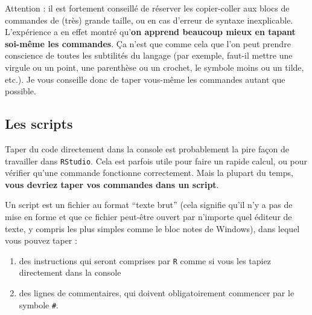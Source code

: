\documentclass[
  a4paper,
  DIV=11,
  numbers=noendperiod,
  oneside]{scrreprt}
\providecommand{\tightlist}{%
  \setlength{\itemsep}{0pt}\setlength{\parskip}{0pt}}\usepackage{longtable,booktabs,array}
\begin{document}
\begin{tcolorbox}[enhanced jigsaw, colbacktitle=quarto-callout-warning-color!10!white, left=2mm, leftrule=.75mm, titlerule=0mm, bottomtitle=1mm, colback=white, breakable, arc=.35mm, bottomrule=.15mm, toprule=.15mm, toptitle=1mm, opacitybacktitle=0.6, title=\textcolor{quarto-callout-warning-color}{\faExclamationTriangle}\hspace{0.5em}{Les risques du ``copier-coller'' {\faIcon{clipboard}}}, coltitle=black, rightrule=.15mm, opacityback=0, colframe=quarto-callout-warning-color-frame]

Attention : il est fortement conseillé de réserver les copier-coller aux
blocs de commandes de (très) grande taille, ou en cas d'erreur de
syntaxe inexplicable. L'expérience a en effet montré qu'\textbf{on
apprend beaucoup mieux {en tapant soi-même les commandes}}. Ça n'est que
comme cela que l'on peut prendre conscience de toutes les subtilités du
langage (par exemple, faut-il mettre une virgule ou un point, une
parenthèse ou un crochet, le symbole moins ou un tilde, etc.). Je vous
conseille donc de taper vous-même les commandes autant que possible.

\end{tcolorbox}

\subsection{Les scripts}\label{sec-script}

Taper du code directement dans la console est probablement la pire façon
de travailler dans \texttt{RStudio}. Cela est parfois utile pour faire
un rapide calcul, ou pour vérifier qu'une commande fonctionne
correctement. Mais la plupart du temps, \textbf{vous devriez taper vos
commandes dans un script}.

\begin{tcolorbox}[enhanced jigsaw, colbacktitle=quarto-callout-important-color!10!white, left=2mm, leftrule=.75mm, titlerule=0mm, bottomtitle=1mm, colback=white, breakable, arc=.35mm, bottomrule=.15mm, toprule=.15mm, toptitle=1mm, opacitybacktitle=0.6, title=\textcolor{quarto-callout-important-color}{\faExclamation}\hspace{0.5em}{Définition importante !}, coltitle=black, rightrule=.15mm, opacityback=0, colframe=quarto-callout-important-color-frame]

Un script est un fichier au format ``texte brut'' (cela signifie qu'il
n'y a pas de mise en forme et que ce fichier peut-être ouvert par
n'importe quel éditeur de texte, y compris les plus simples comme le
bloc notes de Windows), dans lequel vous pouvez taper :

\begin{enumerate}
\def\labelenumi{\arabic{enumi}.}
\tightlist
\item
  des instructions qui seront comprises par \texttt{R} comme si vous les
  tapiez directement dans la console
\item
  des lignes de commentaires, qui doivent obligatoirement commencer par
  le symbole \texttt{\#}.
\end{enumerate}

\end{tcolorbox}
\end{document}

